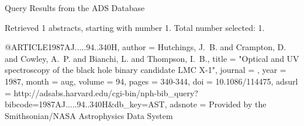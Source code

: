 Query Results from the ADS Database


Retrieved 1 abstracts, starting with number 1.  Total number selected: 1.

@ARTICLE{1987AJ.....94..340H,
   author = {{Hutchings}, J.~B. and {Crampton}, D. and {Cowley}, A.~P. and 
	{Bianchi}, L. and {Thompson}, I.~B.},
    title = "{Optical and UV spectroscopy of the black hole binary candidate LMC X-1}",
  journal = {\aj},
     year = 1987,
    month = aug,
   volume = 94,
    pages = {340-344},
      doi = {10.1086/114475},
   adsurl = {http://adsabs.harvard.edu/cgi-bin/nph-bib_query?bibcode=1987AJ.....94..340H&db_key=AST},
  adsnote = {Provided by the Smithsonian/NASA Astrophysics Data System}
}


